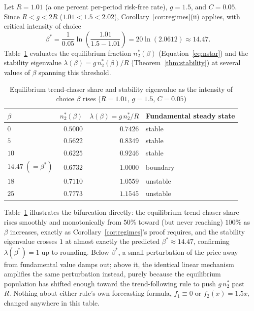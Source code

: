 \documentclass[11pt]{article}
\theoremstyle{remark}
\theoremstyle{definition}
\begin{document}
Let $R=1.01$ (a one percent per-period risk-free rate), $g=1.5$, and $C=0.05$. Since $R<g<2R$ ($1.01<1.5<2.02$), Corollary~\ref{cor:regimes}(ii) applies, with critical intensity of choice
\begin{equation*}
\beta^{*} = \frac{1}{0.05}\ln\!\left(\frac{1.01}{1.5-1.01}\right) = 20\ln(2.0612) \approx 14.47.
\end{equation*}
Table~\ref{tab:brockhommes} evaluates the equilibrium fraction $n_2^{*}(\beta)$ (Equation~\eqref{eq:nstar}) and the stability eigenvalue $\lambda(\beta)=g\,n_2^{*}(\beta)/R$ (Theorem~\ref{thm:stability}) at several values of $\beta$ spanning this threshold.

\begin{table}[htbp]
\centering
\caption{Equilibrium trend-chaser share and stability eigenvalue as the intensity of choice $\beta$ rises ($R=1.01$, $g=1.5$, $C=0.05$)}
\label{tab:brockhommes}
\begin{tabular}{@{}lrrl@{}}
\toprule
$\beta$ & $n_2^{*}(\beta)$ & $\lambda(\beta)=g\,n_2^{*}/R$ & Fundamental steady state \\
\midrule
$0$ & $0.5000$ & $0.7426$ & stable \\
$5$ & $0.5622$ & $0.8349$ & stable \\
$10$ & $0.6225$ & $0.9246$ & stable \\
$14.47\;(=\beta^{*})$ & $0.6732$ & $1.0000$ & boundary \\
$18$ & $0.7110$ & $1.0559$ & unstable \\
$25$ & $0.7773$ & $1.1545$ & unstable \\
\bottomrule
\end{tabular}
\end{table}

Table~\ref{tab:brockhommes} illustrates the bifurcation directly: the equilibrium trend-chaser share rises smoothly and monotonically from $50\%$ toward (but never reaching) $100\%$ as $\beta$ increases, exactly as Corollary~\ref{cor:regimes}'s proof requires, and the stability eigenvalue crosses $1$ at almost exactly the predicted $\beta^{*}\approx14.47$, confirming $\lambda(\beta^{*})=1$ up to rounding. Below $\beta^{*}$, a small perturbation of the price away from fundamental value damps out; above it, the identical linear mechanism amplifies the same perturbation instead, purely because the equilibrium population has shifted enough toward the trend-following rule to push $g\,n_2^{*}$ past $R$. Nothing about either rule's own forecasting formula, $f_1\equiv0$ or $f_2(x)=1.5x$, changed anywhere in this table.
\end{document}
